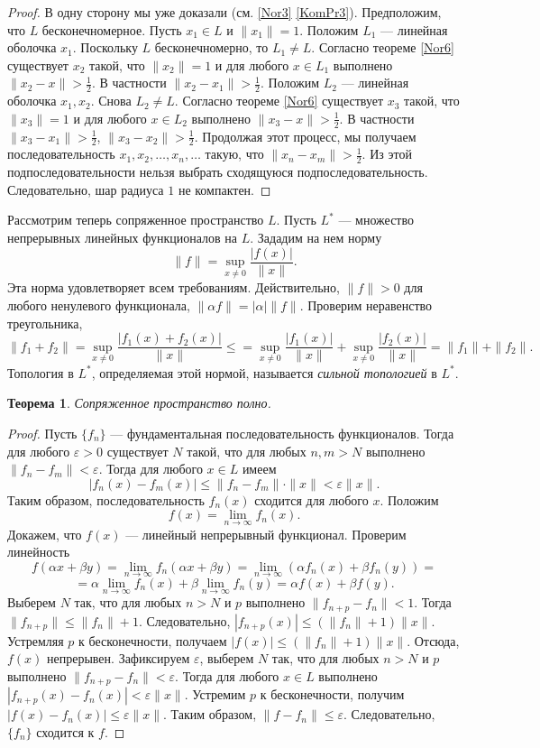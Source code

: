 \documentclass[12pt, titlepage, oneside]{amsbook}
\newtheorem{theorem}{Теорема}[chapter]
\theoremstyle{definition}
\theoremstyle{remark}
\begin{document}
\begin{proof}
	В одну сторону мы уже доказали (см. \ref{Nor3} \ref{KomPr3}). Предположим, что $L$ бесконечномерное. Пусть $x_1\in L$ и $\|x_1\|=1$. Положим $L_1$ --- линейная оболочка $x_1$. Поскольку $L$ бесконечномерно, то $L_1\neq L$. Согласно теореме \ref{Nor6} существует $x_2$ такой, что $\|x_2\|=1$ и для любого $x\in L_1$ выполнено $\|x_2-x\|>\frac{1}{2}$. В частности $\|x_2-x_1\|>\frac{1}{2}$. Положим $L_2$ --- линейная оболочка $x_1,x_2$. Снова $L_2\neq L$. Согласно теореме \ref{Nor6} существует $x_3$ такой, что $\|x_3\|=1$ и для любого $x\in L_2$ выполнено $\|x_3-x\|>\frac{1}{2}$. В частности $\|x_3-x_1\|>\frac{1}{2}$, $\|x_3-x_2\|>\frac{1}{2}$. Продолжая этот процесс, мы получаем последовательность $x_1,x_2,\ldots, x_n,\ldots$ такую, что $\|x_n-x_m\|>\frac{1}{2}$. Из этой подпоследовательности нельзя выбрать сходящуюся подпоследовательность. Следовательно, шар радиуса $1$ не компактен.
\end{proof}

Рассмотрим теперь сопряженное пространство $L$. Пусть $L^*$ --- множество непрерывных линейных функционалов на $L$. Зададим на нем норму $$\|f\|=\sup\limits_{x\neq 0}\frac{|f(x)|}{\|x\|}.$$ Эта норма удовлетворяет всем требованиям. Действительно, $\|f\|>0$ для любого ненулевого функционала, $\|\alpha f\|=|\alpha| \|f\|$. Проверим неравенство треугольника, $$\|f_1+f_2\|=\sup\limits_{x\neq 0}\frac{|f_1(x)+f_2(x)|}{\|x\|}\leq=\sup\limits_{x\neq 0}\frac{|f_1(x)|}{\|x\|}+\sup\limits_{x\neq 0}\frac{|f_2(x)|}{\|x\|}=\|f_1\|+\|f_2\|.$$ Топология в $L^*$, определяемая этой нормой, называется \emph{сильной топологией} в $L^*$.

\begin{theorem}
	\label{Nor8}
	Сопряженное пространство полно.
\end{theorem}

\begin{proof}
	Пусть $\{f_n\}$ --- фундаментальная последовательность функционалов. Тогда для любого $\varepsilon>0$ существует $N$ такой, что для любых $n,m>N$ выполнено $\|f_n-f_m\|<\varepsilon$. Тогда для любого $x\in L$ имеем $$|f_n(x)-f_m(x)|\leq\|f_n-f_m\|\cdot\|x\|<\varepsilon \|x\|.$$ Таким образом, последовательность $f_n(x)$ сходится для любого $x$. Положим $$f(x)=\lim\limits_{n\rightarrow\infty} f_n(x).$$ Докажем, что $f(x)$ --- линейный непрерывный функционал. Проверим линейность $$f(\alpha x+\beta y)=\lim\limits_{n\rightarrow\infty} f_n(\alpha x+\beta y)=\lim\limits_{n\rightarrow\infty} (\alpha f_n(x)+\beta f_n(y))=$$ $$=\alpha\lim\limits_{n\rightarrow\infty} f_n(x)+\beta\lim\limits_{n\rightarrow\infty} f_n(y)=\alpha f(x)+\beta f(y).$$ Выберем $N$ так, что для любых $n>N$ и $p$ выполнено $\|f_{n+p}-f_n\|<1$. Тогда $\|f_{n+p}\|\leq\|f_n\|+1.$ Следовательно, $|f_{n+p}(x)|\leq(\|f_n\|+1)\|x\|.$ Устремляя $p$ к бесконечности, получаем $|f(x)|\leq(\|f_n\|+1)\|x\|$. Отсюда, $f(x)$ непрерывен. Зафиксируем $\varepsilon$, выберем $N$ так, что для любых $n>N$ и $p$ выполнено $\|f_{n+p}-f_n\|<\varepsilon$. Тогда для любого $x\in L$ выполнено $|f_{n+p}(x)-f_n(x)|<\varepsilon\|x\|$. Устремим $p$ к бесконечности, получим $|f(x)-f_n(x)|\leq\varepsilon\|x\|$. Таким образом, $\|f-f_n\|\leq\varepsilon$. Следовательно, $\{f_n\}$ сходится к $f$.
\end{proof}
\end{document}
